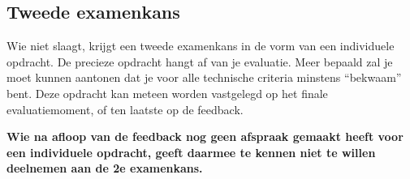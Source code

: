 \subsection{Tweede examenkans}
\label{subs:tweede-examenkans}

Wie niet slaagt, krijgt een tweede examenkans in de vorm van een individuele opdracht. De precieze opdracht hangt af van je evaluatie. Meer bepaald zal je moet kunnen aantonen dat je voor alle technische criteria minstens ``bekwaam'' bent. Deze opdracht kan meteen worden vastgelegd op het finale evaluatiemoment, of ten laatste op de feedback.

\textbf{Wie na afloop van de feedback nog geen afspraak gemaakt heeft voor een individuele opdracht, geeft daarmee te kennen niet te willen deelnemen aan de 2e examenkans.}